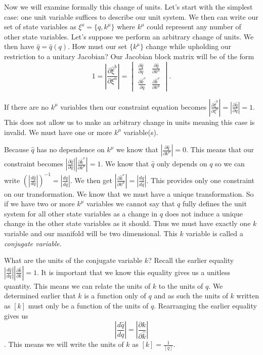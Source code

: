 \documentclass{article}[a4paper]
\begin{document}
	Now we will examine formally this change of units. Let's start with the simplest case: one unit variable suffices to describe our unit system. We then can write our set of state variables as $\xi^a = \{q,k^\mu\}$ where $k^\mu$ could represent any number of other state variables. Let's suppose we perform an arbitrary change of units. We then have $\hat{q} = \hat{q}(q)$. How must our set $\{k^\mu\}$ change while upholding our restriction to a unitary Jacobian? Our Jacobian block matrix will be of the form $$1 = \left|\frac{\partial\hat{\xi}^b}{\partial\xi^a}\right| = \begin{vmatrix}
\frac{\partial \hat{q}}{\partial q} & \frac{\partial \hat{q}}{\partial k^\mu} \\
\frac{\partial \hat{k}^\nu}{\partial q} & \frac{\partial \hat{k}^\nu}{\partial k^\mu}
\end{vmatrix}.$$

	If there are no $k^\mu$ variables then our constraint equation becomes $\left|\frac{\partial\hat{\xi}^b}{\partial\xi^a}\right| = \left|\frac{\partial \hat{q}}{\partial q}\right| = 1$. This does not allow us to make an arbitrary change in units meaning this case is invalid. We must have one or more $k^\mu$ variable(s).

	Because $\hat{q}$ has no dependence on $k^\mu$ we know that $\left|\frac{\partial \hat{q}}{\partial k^\mu}\right| = 0$. This means that our constraint becomes $\left|\frac{\partial \hat{q}}{\partial q}\right|\left|\frac{\partial \hat{k}^\nu}{\partial k^\mu}\right| = 1$. We know that $\hat{q}$ only depends on $q$ so we can write $(\left|\frac{d \hat{q}}{d q}\right|)^{-1} = \left|\frac{d q}{d \hat{q}}\right|$. We then get $\left|\frac{\partial \hat{k}^\nu}{\partial k^\mu}\right| = \left|\frac{d q}{d \hat{q}}\right|$. This provides only one constraint on our transformation. We know that we must have a unique transformation. So if we have two or more $k^\mu$ variables we cannot say that $q$ fully defines the unit system for all other state variables as a change in $q$ does not induce a unique change in the other state variables as it should. Thus we must have exactly one $k$ variable and our manifold will be two dimensional. This $k$ variable is called a \textit{conjugate variable}.
	
	What are the units of the conjugate variable $k$? Recall the earlier equality $\left|\frac{d\hat{q}}{dq}\right|\left|\frac{\partial \hat{k}}{\partial k}\right| = 1$. It is important that we know this equality gives us a unitless quantity. This means we can relate the units of $k$ to the units of $q$. We determined earlier that $k$ is a function only of $q$ and as such the units of $k$ written as $[k]$ must only be a function of the units of $q$. Rearranging the earlier equality gives us $$\left|\frac{d\hat{q}}{dq}\right| = \left|\frac{\partial k}{\partial \hat{k}}\right|$$. This means we will write the units of $k$ as $[k] = \frac{1}{[q]}$.
	
\end{document}

